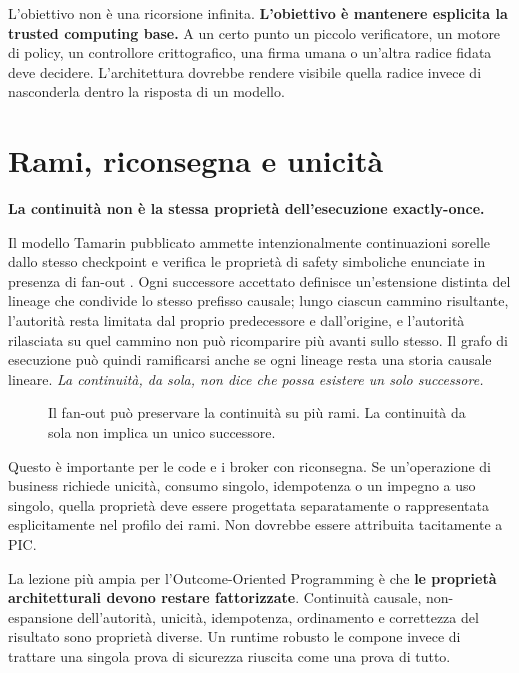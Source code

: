 \documentclass[10pt,oneside,openany]{book}
\begin{document}
L'obiettivo non è una ricorsione infinita. \textbf{L'obiettivo è mantenere esplicita la trusted computing base.} A un certo punto un piccolo verificatore, un motore di policy, un controllore crittografico, una firma umana o un'altra radice fidata deve decidere. L'architettura dovrebbe rendere visibile quella radice invece di nasconderla dentro la risposta di un modello.


\chapter{Rami, riconsegna e unicità}

\textbf{La continuità non è la stessa proprietà dell'esecuzione exactly-once.}

Il modello Tamarin pubblicato ammette intenzionalmente continuazioni sorelle dallo stesso checkpoint e verifica le proprietà di safety simboliche enunciate in presenza di fan-out \cite{pictamarin}. Ogni successore accettato definisce un'estensione distinta del lineage che condivide lo stesso prefisso causale; lungo ciascun cammino risultante, l'autorità resta limitata dal proprio predecessore e dall'origine, e l'autorità rilasciata su quel cammino non può ricomparire più avanti sullo stesso. Il grafo di esecuzione può quindi ramificarsi anche se ogni lineage resta una storia causale lineare. \emph{La continuità, da sola, non dice che possa esistere un solo successore.}

\begin{figure}[ht]
\centering
{}
\caption{Il fan-out può preservare la continuità su più rami. La continuità da sola non implica un unico successore.}
\end{figure}

Questo è importante per le code e i broker con riconsegna. Se un'operazione di business richiede unicità, consumo singolo, idempotenza o un impegno a uso singolo, quella proprietà deve essere progettata separatamente o rappresentata esplicitamente nel profilo dei rami. Non dovrebbe essere attribuita tacitamente a PIC.

La lezione più ampia per l'Outcome-Oriented Programming è che \textbf{le proprietà architetturali devono restare fattorizzate}. Continuità causale, non-espansione dell'autorità, unicità, idempotenza, ordinamento e correttezza del risultato sono proprietà diverse. Un runtime robusto le compone invece di trattare una singola prova di sicurezza riuscita come una prova di tutto.
\end{document}

